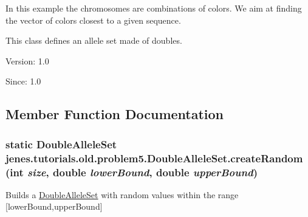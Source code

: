 In this example the chromosomes are combinations of colors. We aim at finding the vector of colors closest to a given sequence.

This class defines an allele set made of doubles.

\begin{Desc}
\item[Version:]1.0 \end{Desc}
\begin{Desc}
\item[Since:]1.0 \end{Desc}


\subsection{Member Function Documentation}
\hypertarget{classjenes_1_1tutorials_1_1old_1_1problem5_1_1_double_allele_set_b055f13f0aade5cd9bf21a42a6c00f67}{
\subsubsection[createRandom]{\setlength{\rightskip}{0pt plus 5cm}static {\bf DoubleAlleleSet} jenes.tutorials.old.problem5.DoubleAlleleSet.createRandom (int {\em size}, \/  double {\em lowerBound}, \/  double {\em upperBound})}}
\label{classjenes_1_1tutorials_1_1old_1_1problem5_1_1_double_allele_set_b055f13f0aade5cd9bf21a42a6c00f67}


Builds a \hyperlink{classjenes_1_1tutorials_1_1old_1_1problem5_1_1_double_allele_set}{DoubleAlleleSet} with random values within the range \mbox{[}lowerBound,upperBound\mbox{]} 

